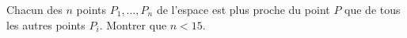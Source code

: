 Chacun des $n$ points $P_1, \ldots, P_n$ de l'espace est plus proche du point $P$ que de tous les autres points $P_i$. Montrer que $n < 15$.
